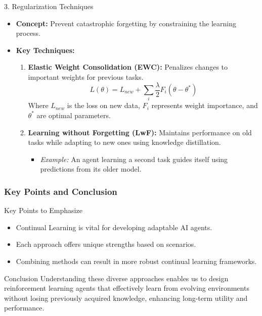\documentclass[aspectratio=169]{beamer}
\begin{document}
\begin{frame}[fragile]
    \begin{block}{3. Regularization Techniques}
        \begin{itemize}
            \item \textbf{Concept:} Prevent catastrophic forgetting by constraining the learning process.
            \item \textbf{Key Techniques:}
                \begin{enumerate}
                    \item \textbf{Elastic Weight Consolidation (EWC):} Penalizes changes to important weights for previous tasks.
                          \begin{equation}
                              L(\theta) = L_{new} + \sum_i \frac{\lambda}{2} F_i(\theta - \theta^*)
                          \end{equation}
                          Where \(L_{new}\) is the loss on new data, \(F_i\) represents weight importance, and \(\theta^*\) are optimal parameters.
                    \item \textbf{Learning without Forgetting (LwF):} Maintains performance on old tasks while adapting to new ones using knowledge distillation.
                          \begin{itemize}
                              \item \textit{Example:} An agent learning a second task guides itself using predictions from its older model.
                          \end{itemize}
                \end{enumerate}
        \end{itemize}
    \end{block}
\end{frame}

\begin{frame}[fragile]
    \frametitle{Key Points and Conclusion}
    \begin{block}{Key Points to Emphasize}
        \begin{itemize}
            \item Continual Learning is vital for developing adaptable AI agents.
            \item Each approach offers unique strengths based on scenarios.
            \item Combining methods can result in more robust continual learning frameworks.
        \end{itemize}
    \end{block}

    \begin{block}{Conclusion}
        Understanding these diverse approaches enables us to design reinforcement learning agents that effectively learn from evolving environments without losing previously acquired knowledge, enhancing long-term utility and performance.
    \end{block}
\end{frame}
\end{document}
